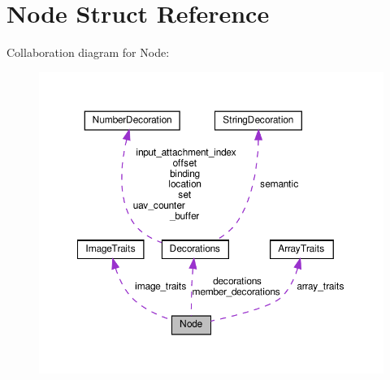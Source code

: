 \hypertarget{structNode}{}\section{Node Struct Reference}
\label{structNode}


Collaboration diagram for Node\+:\nopagebreak
\begin{figure}[H]
\begin{center}
\leavevmode
\includegraphics[width=350pt]{structNode__coll__graph}
\end{center}
\end{figure}
